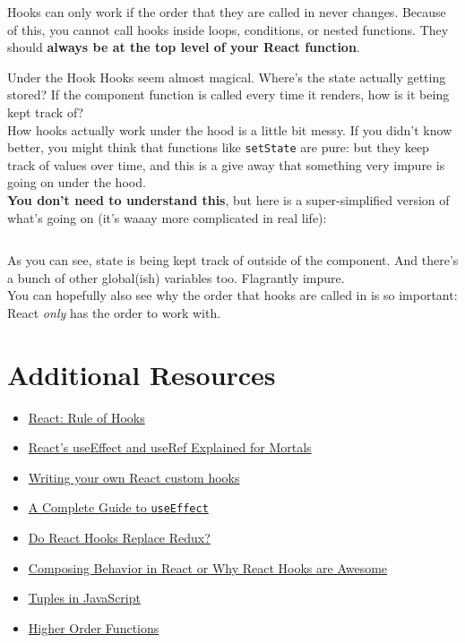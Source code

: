 Hooks can only work if the order that they are called in never changes. Because of this, you cannot call hooks inside loops, conditions, or nested functions. They should \textbf{always be at the top level of your React function}.

\begin{infobox}{Under the Hook}
    Hooks seem almost magical. Where's the state actually getting stored? If the component function is called every time it renders, how is it being kept track of?
    \\

    How hooks actually work under the hood is a little bit messy. If you didn't know better, you might think that functions like \texttt{setState} are pure: but they keep track of values over time, and this is a give away that something very impure is going on under the hood.
    \\

    \textbf{You don't need to understand this}, but here is a super-simplified version of what's going on (it's waaay more complicated in real life):

    \inputminted{js}{05-hooks/figures/15-under-the-hood.js}

    As you can see, state is being kept track of outside of the component. And there's a bunch of other global(ish) variables too. Flagrantly impure.
    \\

    You can hopefully also see why the order that hooks are called in is so important: React \textit{only} has the order to work with.
\end{infobox}


\section{Additional Resources}

\begin{itemize}[leftmargin=*]
    \item \href{http://reactjs.org/docs/hooks-rules.html}{React: Rule of Hooks}
    \item \href{https://leewarrick.com/blog/react-use-effect-explained/}{React's useEffect and useRef Explained for Mortals}
    \item \href{https://tvernon.tech/blog/react-custom-hook-for-forms}{Writing your own React custom hooks}
    \item \href{https://overreacted.io/a-complete-guide-to-useeffect/}{A Complete Guide to \texttt{useEffect}}
    \item \href{https://medium.com/javascript-scene/do-react-hooks-replace-redux-210bab340672}{Do React Hooks Replace Redux?}
    \item \href{https://www.youtube.com/watch?v=nUzLlHFVXx0}{Composing Behavior in React or Why React Hooks are Awesome}
    \item \href{https://medium.com/@ntgard/tuples-in-javascript-cd33321e5277}{Tuples in JavaScript}
    \item \href{https://eloquentjavascript.net/05_higher_order.html}{Higher Order Functions}
\end{itemize}
